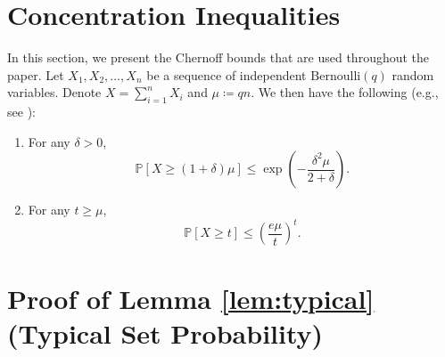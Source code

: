 \documentclass[journal]{IEEEtran}
\theoremstyle{definition}
\theoremstyle{definition}
\newcommand{\PP}{\mathbb{P}}
\begin{document}

	




 
\appendix
 \section{Concentration Inequalities}
\label{appendix:concentration}
In this section, we present the Chernoff bounds that are used throughout the paper. 
Let $X_1, X_2, \dots, X_n$ be a sequence of independent $\mathrm{Bernoulli}(q)$ random variables. 
Denote $X = \sum_{i=1}^{n} X_i$ and $\mu \coloneqq qn$. 
We then have the following (e.g., see \cite[Ch.~2]{boucheron2003concentration}):
\begin{enumerate}
    \item For any $\delta > 0$, 
    \begin{equation}
      \PP \left[X \ge (1+\delta)\mu\right] 
      \leq \exp \left(-\frac{\delta^2 \mu}{2+\delta} \right).
      \label{eq:chernoff1}
    \end{equation}
    \item For any $t \geq \mu$, 
    \begin{equation}
      \PP[X \ge t] 
      \leq \left( \frac{e\mu}{t} \right)^{t}.
      \label{eq:chernoff2}
    \end{equation}
\end{enumerate}

\section{Proof of Lemma \ref{lem:typical} (Typical Set Probability)} \label{sec:pf_typical}
\end{document}

